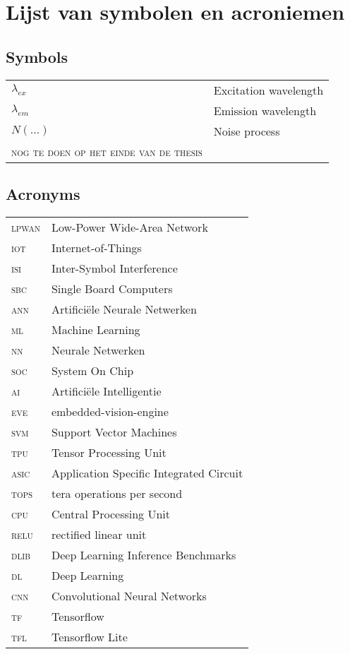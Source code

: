 \chapter*{Lijst van symbolen en acroniemen}

\section*{Symbols}


\begin{longtable}{ll}
$\lambda_{ex}$  &       Excitation wavelength\\
$\lambda_{em}$  &	Emission wavelength\\
$N(\ldots)$	&	Noise process\\
\textsc{nog te doen op het einde van de thesis}
\end{longtable}


\section*{Acronyms}

\begin{longtable}{ll}
\textsc{lpwan}	& Low-Power Wide-Area Network\\
\textsc{iot}	& Internet-of-Things\\
\textsc{isi}	& Inter-Symbol Interference\\
\textsc{sbc}	& Single Board Computers\\
\textsc{ann}	& Artifici\"ele Neurale Netwerken\\
\textsc{ml}	& Machine Learning\\
\textsc{nn}	& Neurale Netwerken\\
\textsc{soc}	& System On Chip\\
\textsc{ai}	& Artifici\"ele Intelligentie\\
\textsc{eve}	& embedded-vision-engine\\
\textsc{svm}	& Support Vector Machines\\
\textsc{tpu}	& Tensor Processing Unit\\
\textsc{asic}	& Application Specific Integrated Circuit\\
\textsc{tops}	& tera operations per second\\
\textsc{cpu}	& Central Processing Unit\\
\textsc{relu}	& rectified linear unit\\
\textsc{dlib}	& Deep Learning Inference Benchmarks\\
\textsc{dl}	& Deep Learning\\
\textsc{cnn}	& Convolutional Neural Networks\\
\textsc{tf}	& Tensorflow\\
\textsc{tfl}	& Tensorflow Lite\\

\end{longtable}


